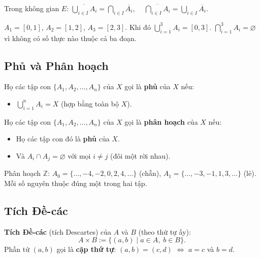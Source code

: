 \documentclass[12pt,a4paper]{article}
\begin{document}
\begin{tinhchat}[title={Luật De Morgan cho họ tập hợp}]
  Trong không gian $E$: $\displaystyle\overline{\bigcup_{i \in I} A_i} = \bigcap_{i \in I} \overline{A_i}$, $\quad \displaystyle\overline{\bigcap_{i \in I} A_i} = \bigcup_{i \in I} \overline{A_i}$.
\end{tinhchat}

\begin{vidu}
  $A_1 = [0,1]$, $A_2 = [1,2]$, $A_3 = [2,3]$. Khi đó $\bigcup_{i=1}^{3} A_i = [0,3]$. $\bigcap_{i=1}^{3} A_i = \varnothing$ vì không có số thực nào thuộc cả ba đoạn.
\end{vidu}

\subsection{Phủ và Phân hoạch}

\begin{dinhnghia}
  Họ các tập con $\{A_1, A_2, \ldots, A_n\}$ của $X$ gọi là \textbf{phủ} của $X$ nếu:
  \begin{itemize}
    \item $\bigcup_{i=1}^{n} A_i = X$ (hợp bằng toàn bộ $X$).
  \end{itemize}
  
  Họ các tập con $\{A_1, A_2, \ldots, A_n\}$ của $X$ gọi là \textbf{phân hoạch} của $X$ nếu:
  \begin{itemize}
    \item Họ các tập con đó là \textbf{phủ} của $X$.
    \item Và $A_i \cap A_j = \varnothing$ với mọi $i \ne j$ (đôi một rời nhau).
  \end{itemize}
\end{dinhnghia}

\begin{vidu}
  Phân hoạch $\mathbb{Z}$: $A_0 = \{\ldots, -4, -2, 0, 2, 4, \ldots\}$ (chẵn), $A_1 = \{\ldots, -3, -1, 1, 3, \ldots\}$ (lẻ). Mỗi số nguyên thuộc đúng một trong hai tập.
\end{vidu}

\subsection{Tích Đề-các}

\begin{dinhnghia}
  \textbf{Tích Đề-các} (tích Descartes) của $A$ và $B$ (theo thứ tự ấy):
  \[
    A \times B := \{(a, b) \mid a \in A,\; b \in B\}.
  \]
  Phần tử $(a, b)$ gọi là \textbf{cặp thứ tự}: $(a, b) = (c, d)$ $\Leftrightarrow$ $a = c$ và $b = d$.
\end{dinhnghia}
\end{document}
